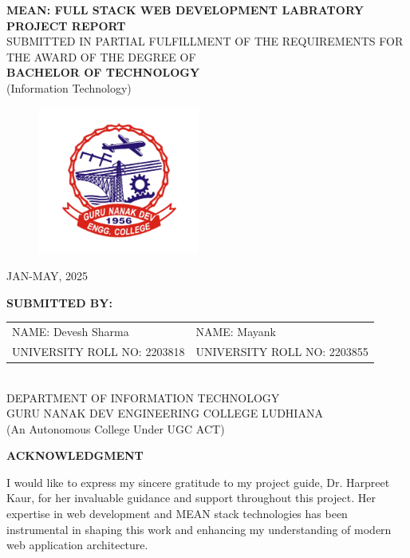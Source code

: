 \documentclass[12pt,a4paper]{article}
\title{}
\date{}
\begin{document}
\centering
\vspace{2cm}
{\large\textbf{
    MEAN: FULL STACK WEB DEVELOPMENT LABRATORY\\
    \vspace{0.5cm}
    PROJECT REPORT\\
}}
\vspace{1cm}
{
\normalsize
SUBMITTED IN PARTIAL FULFILLMENT OF THE REQUIREMENTS FOR THE AWARD OF THE DEGREE OF\\\vspace{0.8cm}
{\large \textbf{BACHELOR OF TECHNOLOGY}\\(Information Technology)}
}

\vspace{2cm}
    \begin{figure}[H]
    \centering
    \includegraphics[width=0.475\textwidth]{assets/GNE_logo.png}
    \end{figure}
    {\large JAN-MAY, 2025}
    \vspace{1cm}

    \textbf{SUBMITTED BY:}\\
    \begin{tabular}{p{7cm}p{7cm}}
    NAME: Devesh Sharma & NAME: Mayank\\
    UNIVERSITY ROLL NO: 2203818 & UNIVERSITY ROLL NO: 2203855\\
    \end{tabular}\\
    \vspace{1cm}
    {DEPARTMENT OF INFORMATION TECHNOLOGY}\\
    \vspace{0.2cm}
    {\large GURU NANAK DEV ENGINEERING COLLEGE LUDHIANA}\\
    \vspace{0.2cm}
    (An Autonomous College Under UGC ACT)

\justifying
\newpage

\begin{center}
    \textbf{ACKNOWLEDGMENT}
\end{center}
I would like to express my sincere gratitude to my project guide, Dr. Harpreet Kaur, for her invaluable guidance and support throughout this project. Her expertise in web development and MEAN stack technologies has been instrumental in shaping this work and enhancing my understanding of modern web application architecture.
\end{document}

